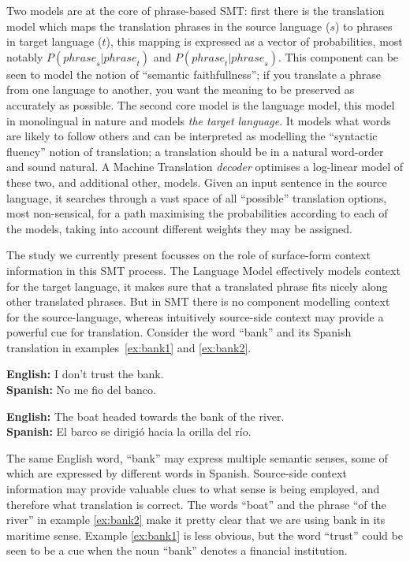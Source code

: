 \documentclass[11pt]{article}
\begin{document}
Two models are at the core of phrase-based SMT: first there is the translation
model which maps the translation phrases in the source language ($s$) to
phrases in target language ($t$), this mapping is expressed as a vector of
probabilities, most notably $P({phrase}_s|{phrase}_t)$ and
$P({phrase}_t|{phrase}_s)$. This component can be seen to model the notion of
``semantic faithfullness''; if you translate a phrase from one language to
another, you want the meaning to be preserved as accurately as possible. The
second core model is the language model, this model in monolingual in nature
and models \emph{the target language}. It models what words are likely to
follow others and can be interpreted as modelling the ``syntactic fluency''
notion of translation; a translation should be in a natural word-order and
sound natural. A Machine Translation \emph{decoder} optimises a log-linear
model of these two, and additional other, models. Given an input sentence in
the source language, it searches through a vast space of all ``possible''
translation options, most non-sensical, for a path maximising the probabilities
according to each of the models, taking into account different weights they may
be assigned.

The study we currently present focusses on the role of surface-form context
information in this SMT process. The Language Model effectively models context
for the target language, it makes sure that a translated phrase fits nicely
along other translated phrases. But in SMT there is no component modelling
context for the source-language, whereas intuitively source-side context may
provide a powerful cue for translation. Consider the word ``bank'' and its
Spanish translation in examples~\ref{ex:bank1} and \ref{ex:bank2}.

\begin{exe} %
\ex \textbf{English:} I don't trust the bank. \\
    \textbf{Spanish:} No me fio del banco.
\label{ex:bank1}

\ex \textbf{English:} The boat headed towards the bank of the river. \\
    \textbf{Spanish:} El barco se dirigió hacia la orilla del río.
\label{ex:bank2}
\end{exe}

The same English word, ``bank'' may express multiple semantic senses, some of
which are expressed by different words in Spanish. Source-side context
information may provide valuable clues to what sense is being employed, and
therefore what translation is correct.  The words ``boat'' and the phrase ``of
the river'' in example \ref{ex:bank2} make it pretty clear that we are using
bank in its maritime sense. Example \ref{ex:bank1} is less obvious, but the
word ``trust'' could be seen to be a cue when the noun ``bank'' denotes a
financial institution.
\end{document}

